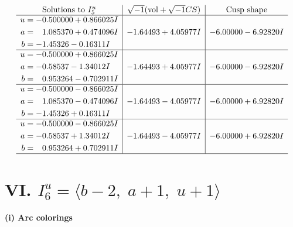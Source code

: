 \documentclass[1p]{elsarticle_modified}
\theoremstyle{definition}
\newcommand{\I}{\sqrt{-1}}
\begin{document}
$$\begin{array}{c|c|c}  
\text{Solutions to }I^u_{5}& \I (\text{vol} + \sqrt{-1}CS) & \text{Cusp shape}\\
 \hline 
\begin{aligned}
u &= -0.500000 + 0.866025 I \\
a &= \phantom{-}1.085370 + 0.474096 I \\
b &= -1.45326 - 0.16311 I\end{aligned}
 & -1.64493 + 4.05977 I & -6.00000 - 6.92820 I \\ \hline\begin{aligned}
u &= -0.500000 + 0.866025 I \\
a &= -0.58537 - 1.34012 I \\
b &= \phantom{-}0.953264 - 0.702911 I\end{aligned}
 & -1.64493 + 4.05977 I & -6.00000 - 6.92820 I \\ \hline\begin{aligned}
u &= -0.500000 - 0.866025 I \\
a &= \phantom{-}1.085370 - 0.474096 I \\
b &= -1.45326 + 0.16311 I\end{aligned}
 & -1.64493 - 4.05977 I & -6.00000 + 6.92820 I \\ \hline\begin{aligned}
u &= -0.500000 - 0.866025 I \\
a &= -0.58537 + 1.34012 I \\
b &= \phantom{-}0.953264 + 0.702911 I\end{aligned}
 & -1.64493 - 4.05977 I & -6.00000 + 6.92820 I\\
 \hline 
 \end{array}$$\newpage\newpage\renewcommand{\arraystretch}{1}
\centering \section*{VI. $I^u_{6}= \langle b-2,\;a+1,\;u+1 \rangle$}
\flushleft \textbf{(i) Arc colorings}\\
\end{document}
